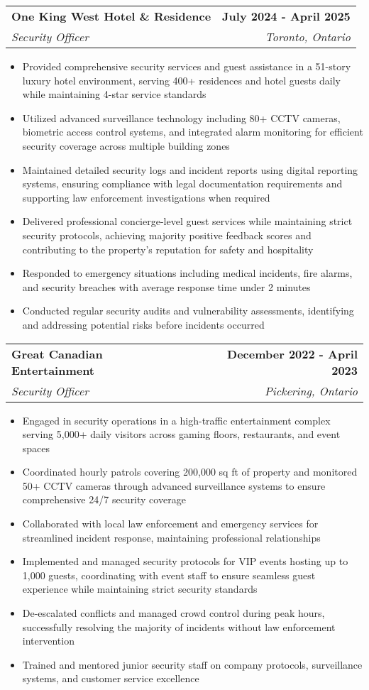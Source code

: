 \documentclass[letterpaper,11pt]{article}
\makeatletter
\newcommand{\resumeItem}[1]{
  \item\small{
    {#1 \vspace{-2pt}}
  }
}
\newcommand{\resumeSubheading}[4]{
  \vspace{-2pt}\item
    \begin{tabular*}{1.0\textwidth}[t]{l@{\extracolsep{\fill}}r}
      \textbf{#1} & \textbf{\small #2} \\
      \textit{\small#3} & \textit{\small #4} \\
    \end{tabular*}\vspace{-7pt}
}
\newcommand{\resumeItemListStart}{\begin{itemize}}
\newcommand{\resumeItemListEnd}{\end{itemize}\vspace{-5pt}}
\makeatother
\begin{document}
    \resumeSubheading
      {One King West Hotel \& Residence}{July 2024 - April 2025}
      {Security Officer}{Toronto, Ontario}
      \resumeItemListStart
        \resumeItem{Provided comprehensive security services and guest assistance in a 51-story luxury hotel environment, serving 400+ residences and hotel guests daily while maintaining 4-star service standards}
        \resumeItem{Utilized advanced surveillance technology including 80+ CCTV cameras, biometric access control systems, and integrated alarm monitoring for efficient security coverage across multiple building zones}
        \resumeItem{Maintained detailed security logs and incident reports using digital reporting systems, ensuring compliance with legal documentation requirements and supporting law enforcement investigations when required}
        \resumeItem{Delivered professional concierge-level guest services while maintaining strict security protocols, achieving majority positive feedback scores and contributing to the property's reputation for safety and hospitality}
        \resumeItem{Responded to emergency situations including medical incidents, fire alarms, and security breaches with average response time under 2 minutes}
        \resumeItem{Conducted regular security audits and vulnerability assessments, identifying and addressing potential risks before incidents occurred}
    \resumeItemListEnd

    \resumeSubheading
      {Great Canadian Entertainment}{December 2022 - April 2023}
      {Security Officer}{Pickering, Ontario}
      \resumeItemListStart
        \resumeItem{Engaged in security operations in a high-traffic entertainment complex serving 5,000+ daily visitors across gaming floors, restaurants, and event spaces}
        \resumeItem{Coordinated hourly patrols covering 200,000 sq ft of property and monitored 50+ CCTV cameras through advanced surveillance systems to ensure comprehensive 24/7 security coverage}
        \resumeItem{Collaborated with local law enforcement and emergency services for streamlined incident response, maintaining professional relationships}
        \resumeItem{Implemented and managed security protocols for VIP events hosting up to 1,000 guests, coordinating with event staff to ensure seamless guest experience while maintaining strict security standards}
        \resumeItem{De-escalated conflicts and managed crowd control during peak hours, successfully resolving the majority of incidents without law enforcement intervention}
        \resumeItem{Trained and mentored junior security staff on company protocols, surveillance systems, and customer service excellence}
      \resumeItemListEnd
\end{document}
